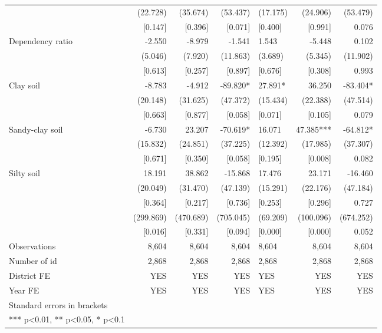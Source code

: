 \documentclass[
]{article}
\begin{document}
\begin{landscape}
\begin{ThreePartTable}
\begin{longtable}[t]{lrrrlrr}
 & (22.728) & (35.674) & (53.437) & (17.175) & (24.906) & (53.479)\\
 & {}[0.147] & {}[0.396] & {}[0.071] & {}[0.400] & {}[0.991] & 0.076\\
Dependency ratio & -2.550 & -8.979 & -1.541 & 1.543 & -5.448 & 0.102\\
 & (5.046) & (7.920) & (11.863) & (3.689) & (5.345) & (11.902)\\
 & {}[0.613] & {}[0.257] & {}[0.897] & {}[0.676] & {}[0.308] & 0.993\\
Clay soil & -8.783 & -4.912 & -89.820* & 27.891* & 36.250 & -83.404*\\
 & (20.148) & (31.625) & (47.372) & (15.434) & (22.388) & (47.514)\\
 & {}[0.663] & {}[0.877] & {}[0.058] & {}[0.071] & {}[0.105] & 0.079\\
Sandy-clay soil & -6.730 & 23.207 & -70.619* & 16.071 & 47.385*** & -64.812*\\
 & (15.832) & (24.851) & (37.225) & (12.392) & (17.985) & (37.307)\\
 & {}[0.671] & {}[0.350] & {}[0.058] & {}[0.195] & {}[0.008] & 0.082\\
Silty soil & 18.191 & 38.862 & -15.868 & 17.476 & 23.171 & -16.460\\
 & (20.049) & (31.470) & (47.139) & (15.291) & (22.176) & (47.184)\\
 & {}[0.364] & {}[0.217] & {}[0.736] & {}[0.253] & {}[0.296] & 0.727\\
 & (299.869) & (470.689) & (705.045) & (69.209) & (100.096) & (674.252)\\
 & {}[0.016] & {}[0.331] & {}[0.094] & {}[0.000] & {}[0.000] & 0.052\\
Observations & 8,604 & 8,604 & 8,604 & 8,604 & 8,604 & 8,604\\
Number of id & 2,868 & 2,868 & 2,868 & 2,868 & 2,868 & 2,868\\
District FE & YES & YES & YES & YES & YES & YES\\
Year FE & YES & YES & YES & YES & YES & YES\\
Standard errors in brackets &  &  &  &  &  & \\
*** p<0.01, ** p<0.05, * p<0.1 &  &  &  &  &  & \\*
\end{longtable}
\end{ThreePartTable}
\endgroup{}
\end{landscape}

\newpage
\end{document}

